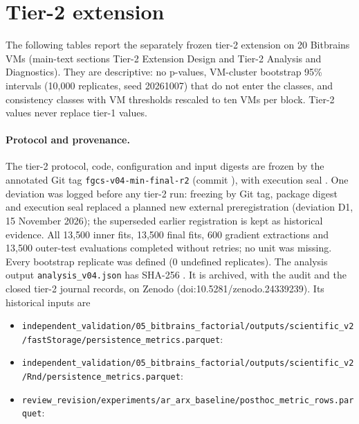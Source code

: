 \documentclass[a4paper,11pt]{article}
\begin{document}
\section*{Tier-2 extension}
The following tables report the separately frozen tier-2 extension on 20 Bitbrains VMs (main-text sections Tier-2 Extension Design and Tier-2 Analysis and Diagnostics). They are descriptive: no p-values, VM-cluster bootstrap 95\% intervals (10{,}000 replicates, seed 20261007) that do not enter the classes, and consistency classes with VM thresholds rescaled to ten VMs per block. Tier-2 values never replace tier-1 values.

\paragraph{Protocol and provenance.} The tier-2 protocol, code, configuration and input digests are frozen by the annotated Git tag \texttt{fgcs-v04-min-final-r2} (commit \texttt{}), with execution seal \texttt{}. One deviation was logged before any tier-2 run: freezing by Git tag, package digest and execution seal replaced a planned new external preregistration (deviation D1, 15 November 2026); the superseded earlier registration is kept as historical evidence. All 13{,}500 inner fits, 13{,}500 final fits, 600 gradient extractions and 13{,}500 outer-test evaluations completed without retries; no unit was missing. Every bootstrap replicate was defined (0 undefined replicates). The analysis output \texttt{analysis\_v04.json} has SHA-256 \texttt{}. It is archived, with the audit and the closed tier-2 journal records, on Zenodo (doi:10.5281/zenodo.24339239). Its historical inputs are
\begin{itemize}\footnotesize\raggedright
\item \nolinkurl{independent_validation/05_bitbrains_factorial/outputs/scientific_v2/fastStorage/persistence_metrics.parquet}:\\ \texttt{}
\item \nolinkurl{independent_validation/05_bitbrains_factorial/outputs/scientific_v2/Rnd/persistence_metrics.parquet}:\\ \texttt{}
\item \nolinkurl{review_revision/experiments/ar_arx_baseline/posthoc_metric_rows.parquet}:\\ \texttt{}
\end{itemize}
\end{document}
